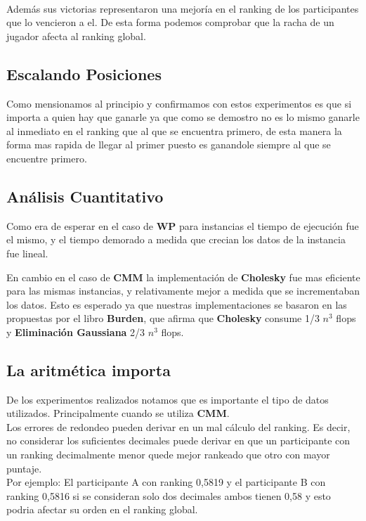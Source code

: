 \\
Además sus victorias representaron una mejoría en el ranking de los participantes que lo vencieron a el. De esta forma podemos comprobar que la racha de un jugador afecta al ranking global.\\


\subsection{Escalando Posiciones}
Como mensionamos al principio y confirmamos con estos experimentos es que si importa a quien hay que ganarle ya que como se demostro no es lo mismo ganarle al inmediato en el ranking que al que se encuentra primero,
de esta manera la forma mas rapida de llegar al primer puesto es ganandole siempre al que se encuentre primero.

\subsection{Análisis Cuantitativo}

Como era de esperar en el caso de \textbf{WP} para instancias el tiempo de ejecución fue el mismo, y el tiempo demorado a medida que crecian los datos de la instancia fue lineal.

En cambio en el caso de \textbf{CMM} la implementación de \textbf{Cholesky} fue mas eficiente para las mismas instancias, y relativamente mejor a medida que se incrementaban los datos. 
Esto es esperado ya que nuestras implementaciones se basaron en las propuestas por el libro \textbf{Burden}, que afirma que \textbf{Cholesky} consume 1/3 $n^3$ flops y \textbf{Eliminación Gaussiana} 2/3 $n^3$ flops.


\subsection{La aritmética importa}

De los experimentos realizados notamos que es importante el tipo de datos utilizados. Principalmente cuando se utiliza \textbf{CMM}.
\\

Los errores de redondeo pueden derivar en un mal cálculo del ranking. Es decir, no considerar los suficientes decimales puede derivar en que un participante con un ranking
decimalmente menor quede mejor rankeado que otro con mayor puntaje.\\

Por ejemplo: El participante A con ranking 0,5819 y el participante B con ranking 0,5816 si se consideran solo dos decimales ambos tienen 0,58 y esto podria afectar su orden 
en el ranking global. \\

